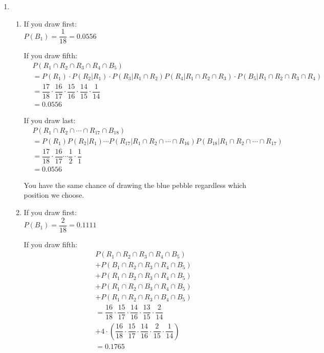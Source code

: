 \documentclass{article}
\begin{document}
\begin{enumerate}
	\item
	  \begin{enumerate}
	    \item 
	      If you draw first: \\
		$P(B_1) = \dfrac{1}{18} = 0.0556$ 
		
	      If you draw fifth: \\
	      \begin{align*}
		&P(R_1 \cap R_2 \cap R_3 \cap R_4 \cap B_5) \\
		&= P(R_1)\cdot P(R_2|R_1)\cdot P(R_3|R_1 \cap R_2)
		  P(R_4|R_1 \cap R_2 \cap R_3)\cdot P(B_5|R_1 \cap R_2 \cap R_3 \cap R_4) \\
		&= \dfrac{17}{18}\cdot\dfrac{16}{17}\cdot\dfrac{15}{16}\cdot\dfrac{14}{15}\cdot\dfrac{1}{14} \\
		&= 0.0556
	      \end{align*}
	      
	      If you draw last: \\
	      \begin{align*}
	       &P(R_1 \cap R_2 \cap \cdots \cap R_{17} \cap B_{18}) \\
	       &= P(R_1)P(R_2|R_1)\cdots P(R_{17}|R_1 \cap R_2 \cap \cdots \cap R_{16}) 
		P(B_{18}|R_1 \cap R_2 \cap \cdots \cap R_{17}) \\
	       &= \dfrac{17}{18} \cdot \dfrac{16}{17} \cdots \dfrac{1}{2} \cdot \dfrac{1}{1} \\
	       &= 0.0556
	      \end{align*}

	      You have the same chance of drawing the blue pebble regardless which position we choose.
	    \item 
	      If you draw first: \\
		$P(B_1) = \dfrac{2}{18} = 0.1111$ 
		
	      If you draw fifth: \\
	      \begin{align*}
		&P(R_1 \cap R_2 \cap R_3 \cap R_4 \cap B_5) \\
		  &+ P(B_1 \cap R_2 \cap R_3 \cap R_4 \cap B_5) \\
		  &+ P(R_1 \cap B_2 \cap R_3 \cap R_4 \cap B_5) \\
		  &+ P(R_1 \cap R_2 \cap B_3 \cap R_4 \cap B_5) \\
		  &+ P(R_1 \cap R_2 \cap R_3 \cap B_4 \cap B_5) \\
		&= \dfrac{16}{18}\cdot\dfrac{15}{17}\cdot\dfrac{14}{16}\cdot\dfrac{13}{15}\cdot\dfrac{2}{14} \\
		  &+ 4 \cdot 
		    \left(\dfrac{16}{18}\cdot\dfrac{15}{17}\cdot\dfrac{14}{16}\cdot\dfrac{2}{15}\cdot\dfrac{1}{14}\right) \\
		&= 0.1765
	      \end{align*}
	      

\end{enumerate}
\end{enumerate}
\end{document}
